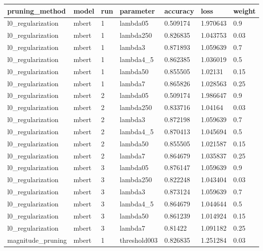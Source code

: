 \begin{tabular}{lllllll}
\toprule
       pruning\_method & model & run &    parameter &  accuracy &      loss & weight \\
\midrule
    l0\_regularization & mbert &   1 &     lambda05 &  0.509174 &  1.970643 &    0.9 \\
    l0\_regularization & mbert &   1 &    lambda250 &  0.826835 &  1.043753 &   0.03 \\
    l0\_regularization & mbert &   1 &      lambda3 &  0.871893 &  1.059639 &    0.7 \\
    l0\_regularization & mbert &   1 &    lambda4\_5 &  0.862385 &  1.036019 &    0.5 \\
    l0\_regularization & mbert &   1 &     lambda50 &  0.855505 &   1.02131 &   0.15 \\
    l0\_regularization & mbert &   1 &      lambda7 &  0.865826 &  1.028563 &   0.25 \\
    l0\_regularization & mbert &   2 &     lambda05 &  0.509174 &  1.986647 &    0.9 \\
    l0\_regularization & mbert &   2 &    lambda250 &  0.833716 &   1.04164 &   0.03 \\
    l0\_regularization & mbert &   2 &      lambda3 &  0.872198 &  1.059639 &    0.7 \\
    l0\_regularization & mbert &   2 &    lambda4\_5 &  0.870413 &  1.045694 &    0.5 \\
    l0\_regularization & mbert &   2 &     lambda50 &  0.855505 &  1.021587 &   0.15 \\
    l0\_regularization & mbert &   2 &      lambda7 &  0.864679 &  1.035837 &   0.25 \\
    l0\_regularization & mbert &   3 &     lambda05 &  0.876147 &  1.059639 &    0.9 \\
    l0\_regularization & mbert &   3 &    lambda250 &  0.822248 &  1.043404 &   0.03 \\
    l0\_regularization & mbert &   3 &      lambda3 &  0.873124 &  1.059639 &    0.7 \\
    l0\_regularization & mbert &   3 &    lambda4\_5 &  0.864679 &  1.044644 &    0.5 \\
    l0\_regularization & mbert &   3 &     lambda50 &  0.861239 &  1.014924 &   0.15 \\
    l0\_regularization & mbert &   3 &      lambda7 &   0.81422 &  1.091182 &   0.25 \\
    magnitude\_pruning & mbert &   1 & threshold003 &  0.826835 &  1.251284 &   0.03 \\

\end{tabular}
